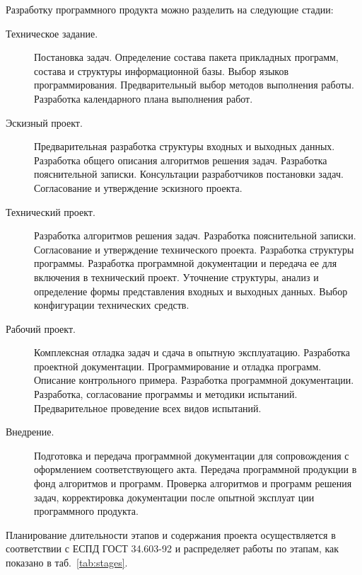 \documentclass[a4paper,12pt]{article}\usepackage[]{graphicx}\usepackage[]{color}
\numberwithin{equation}{section}
\begin{document}
Разработку  программного  продукта  можно  разделить  на  следующие 
стадии: 
\begin{description}
\item[Техническое  задание.] Постановка  задач.  Определение  состава  пакета 
прикладных  программ,  состава  и  структуры  информационной  базы.  Выбор 
языков  программирования.  Предварительный  выбор  методов  выполнения 
работы. Разработка календарного плана выполнения работ. 
\item[Эскизный  проект.] Предварительная  разработка  структуры  входных  и 
выходных  данных.  Разработка  общего  описания  алгоритмов  решения  задач. 
Разработка пояснительной записки. Консультации разработчиков постановки 
задач. Согласование и утверждение эскизного проекта. 
\item[Технический проект.] Разработка алгоритмов решения задач.  Разработка
пояснительной записки.  Согласование и утверждение технического проекта.
Разработка структуры программы.  Разработка программной документации и передача
ее для включения в технический проект.  Уточнение структуры, анализ и
определение формы представления входных и выходных данных. Выбор конфигурации
технических средств.
\item[Рабочий проект.] Комплексная отладка задач и сдача в опытную эксплуатацию.
Разработка проектной документации.  Программирование и отладка программ.
Описание контрольного примера.  Разработка программной документации.
Разработка, согласование программы и методики испытаний. Предварительное
проведение всех видов испытаний.
\item[Внедрение.] Подготовка и передача программной документации для
сопровождения с оформлением соответствующего акта.  Передача программной
продукции в фонд алгоритмов и программ.  Проверка алгоритмов и программ решения
задач, корректировка документации после опытной эксплуат ции программного
продукта.
\end{description}
Планирование длительности этапов и содержания проекта осуществляется в
соответствии с ЕСПД ГОСТ 34.603-92 и распределяет работы по этапам, как показано
в таб.~\ref{tab:stages}.
\end{document}
